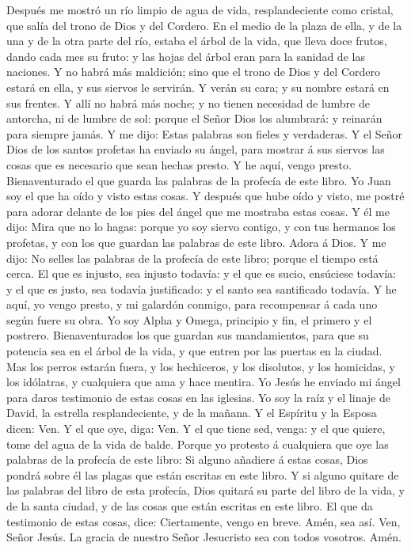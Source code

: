  Después me mostró un río limpio de agua de vida,
resplandeciente como cristal, que salía del trono de Dios y del Cordero.
 En el medio de la plaza de ella, y de la una y de la otra
parte del río, estaba el árbol de la vida, que lleva doce frutos, dando
cada mes su fruto: y las hojas del árbol eran para la sanidad de las
naciones.  Y no habrá más maldición; sino que el trono de
Dios y del Cordero estará en ella, y sus siervos le servirán.
 Y verán su cara; y su nombre estará en sus frentes.
 Y allí no habrá más noche; y no tienen necesidad de
lumbre de antorcha, ni de lumbre de sol: porque el Señor Dios los
alumbrará: y reinarán para siempre jamás.  Y me dijo:
Estas palabras son fieles y verdaderas. Y el Señor Dios de los santos
profetas ha enviado su ángel, para mostrar á sus siervos las cosas que
es necesario que sean hechas presto.  Y he aquí, vengo
presto. Bienaventurado el que guarda las palabras de la profecía de este
libro.  Yo Juan soy el que ha oído y visto estas cosas. Y
después que hube oído y visto, me postré para adorar delante de los pies
del ángel que me mostraba estas cosas.  Y él me dijo: Mira
que no lo hagas: porque yo soy siervo contigo, y con tus hermanos los
profetas, y con los que guardan las palabras de este libro. Adora á
Dios.  Y me dijo: No selles las palabras de la profecía
de este libro; porque el tiempo está cerca.  El que es
injusto, sea injusto todavía: y el que es sucio, ensúciese todavía: y el
que es justo, sea todavía justificado: y el santo sea santificado
todavía.  Y he aquí, yo vengo presto, y mi galardón
conmigo, para recompensar á cada uno según fuere su obra.
 Yo soy Alpha y Omega, principio y fin, el primero y el
postrero.  Bienaventurados los que guardan sus
mandamientos, para que su potencia sea en el árbol de la vida, y que
entren por las puertas en la ciudad.  Mas los perros
estarán fuera, y los hechiceros, y los disolutos, y los homicidas, y los
idólatras, y cualquiera que ama y hace mentira.  Yo Jesús
he enviado mi ángel para daros testimonio de estas cosas en las
iglesias. Yo soy la raíz y el linaje de David, la estrella
resplandeciente, y de la mañana.  Y el Espíritu y la
Esposa dicen: Ven. Y el que oye, diga: Ven. Y el que tiene sed, venga: y
el que quiere, tome del agua de la vida de balde.  Porque
yo protesto á cualquiera que oye las palabras de la profecía de este
libro: Si alguno añadiere á estas cosas, Dios pondrá sobre él las plagas
que están escritas en este libro.  Y si alguno quitare de
las palabras del libro de esta profecía, Dios quitará su parte del libro
de la vida, y de la santa ciudad, y de las cosas que están escritas en
este libro.  El que da testimonio de estas cosas, dice:
Ciertamente, vengo en breve. Amén, sea así. Ven, Señor Jesús.
 La gracia de nuestro Señor Jesucristo sea con todos
vosotros. Amén.
